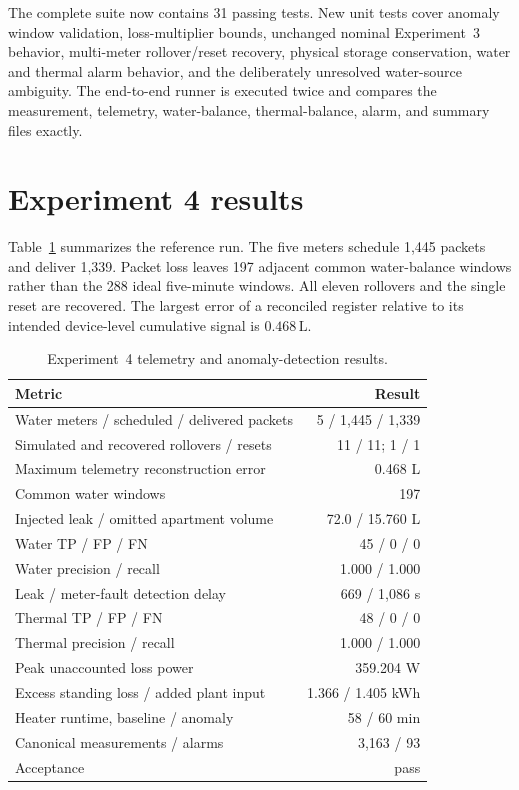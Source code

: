 \documentclass[11pt,a4paper]{article}
\begin{document}
The complete suite now contains 31 passing tests. New unit tests cover anomaly
window validation, loss-multiplier bounds, unchanged nominal Experiment~3
behavior, multi-meter rollover/reset recovery, physical storage conservation,
water and thermal alarm behavior, and the deliberately unresolved water-source
ambiguity. The end-to-end runner is executed twice and compares the measurement,
telemetry, water-balance, thermal-balance, alarm, and summary files exactly.

\section{Experiment 4 results}
Table~\ref{tab:experiment4-results} summarizes the reference run. The five
meters schedule 1,445 packets and deliver 1,339. Packet loss leaves 197 adjacent
common water-balance windows rather than the 288 ideal five-minute windows.
All eleven rollovers and the single reset are recovered. The largest error of a
reconciled register relative to its intended device-level cumulative signal is
$0.468\,\mathrm{L}$.

\begin{table}[htbp]
  \centering
  \caption{Experiment~4 telemetry and anomaly-detection results.}
  \label{tab:experiment4-results}
  \begin{tabular}{lr}
    \toprule
    Metric & Result \\
    \midrule
    Water meters / scheduled / delivered packets & 5 / 1,445 / 1,339 \\
    Simulated and recovered rollovers / resets & 11 / 11; 1 / 1 \\
    Maximum telemetry reconstruction error & 0.468 L \\
    Common water windows & 197 \\
    Injected leak / omitted apartment volume & 72.0 / 15.760 L \\
    Water TP / FP / FN & 45 / 0 / 0 \\
    Water precision / recall & 1.000 / 1.000 \\
    Leak / meter-fault detection delay & 669 / 1,086 s \\
    Thermal TP / FP / FN & 48 / 0 / 0 \\
    Thermal precision / recall & 1.000 / 1.000 \\
    Peak unaccounted loss power & 359.204 W \\
    Excess standing loss / added plant input & 1.366 / 1.405 kWh \\
    Heater runtime, baseline / anomaly & 58 / 60 min \\
    Canonical measurements / alarms & 3,163 / 93 \\
    Acceptance & pass \\
    \bottomrule
  \end{tabular}
\end{table}
\end{document}
